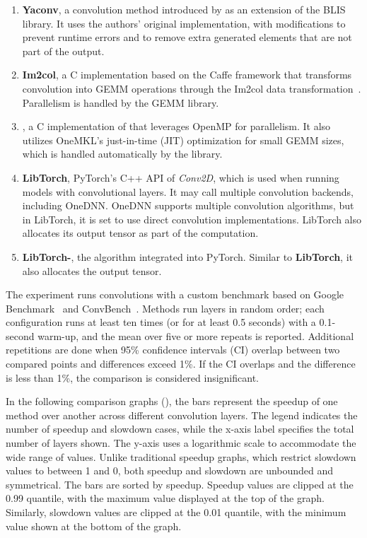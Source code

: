 \begin{enumerate}
    \item \textbf{Yaconv}, a convolution method introduced by \citet{Korostelev2023} as an extension of the BLIS library.
    It uses the authors' original implementation, with modifications to prevent runtime errors and to remove extra generated elements that are not part of the output.
    
    \item \textbf{Im2col}, a C implementation based on the Caffe framework that transforms convolution into GEMM operations through the Im2col data transformation~\cite{chellapilla2006, caffe2014}.
    Parallelism is handled by the GEMM library.
    
    \item \textbf{\algname}, a C implementation of \algfullname that leverages OpenMP for parallelism. It also utilizes OneMKL's just-in-time (JIT) optimization for small GEMM sizes, which is handled automatically by the library.

    \item \textbf{LibTorch}, PyTorch's C++ API of \emph{Conv2D}, which is used when running models with convolutional layers.
    It may call multiple convolution backends, including OneDNN.
    OneDNN supports multiple convolution algorithms, but in LibTorch, it is set to use direct convolution implementations.
    LibTorch also allocates its output tensor as part of the computation.

    \item \textbf{LibTorch-\algname}, the \algname algorithm integrated into PyTorch. Similar to \textbf{LibTorch}, it also allocates the output tensor.
  \end{enumerate}

The experiment runs convolutions with a custom benchmark based on Google Benchmark~\cite{googlebench} and ConvBench~\cite{convbench}. 
Methods run layers in random order; each configuration runs at least ten times (or for at least 0.5 seconds) with a 0.1-second warm-up, and the mean over five or more repeats is reported.
Additional repetitions are done when 95\% confidence intervals (CI) overlap between two compared points and differences exceed 1\%.
If the CI overlaps and the difference is less than 1\%, the comparison is considered insignificant.

In the following comparison graphs (), the bars represent the speedup of one method over another across different convolution layers. 
The legend indicates the number of speedup and slowdown cases, while the x-axis label specifies the total number of layers shown.
The y-axis uses a logarithmic scale to accommodate the wide range of values.
Unlike traditional speedup graphs, which restrict slowdown values to between 1 and 0, both speedup and slowdown are unbounded and symmetrical.
The bars are sorted by speedup.
Speedup values are clipped at the 0.99 quantile, with the maximum value displayed at the top of the graph.
Similarly, slowdown values are clipped at the 0.01 quantile, with the minimum value shown at the bottom of the graph.

